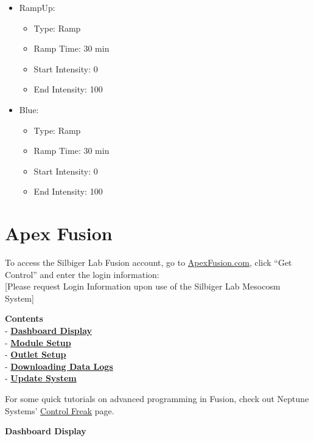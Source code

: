 \documentclass[
]{book}
\providecommand{\tightlist}{%
  \setlength{\itemsep}{0pt}\setlength{\parskip}{0pt}}
\begin{document}
\begin{itemize}
\tightlist
\item
  RampUp:

  \begin{itemize}
  \tightlist
  \item
    Type: Ramp
  \item
    Ramp Time: 30 min
  \item
    Start Intensity: 0
  \item
    End Intensity: 100
  \end{itemize}
\item
  Blue:

  \begin{itemize}
  \tightlist
  \item
    Type: Ramp
  \item
    Ramp Time: 30 min
  \item
    Start Intensity: 0
  \item
    End Intensity: 100
  \end{itemize}
\end{itemize}

\hypertarget{apex-fusion}{%
\chapter{Apex Fusion}\label{apex-fusion}}

To access the Silbiger Lab Fusion account, go to \href{https://apexfusion.com}{ApexFusion.com}, click ``Get Control'' and enter the login information:\\
{[}Please request Login Information upon use of the Silbiger Lab Mesocosm System{]}

\textbf{Contents}\\
- \protect\hyperlink{Dashboard}{\textbf{Dashboard Display}}\\
- \protect\hyperlink{Module_Setup}{\textbf{Module Setup}}\\
- \protect\hyperlink{Outlet_Setup}{\textbf{Outlet Setup}}\\
- \protect\hyperlink{Data_Logs}{\textbf{Downloading Data Logs}}\\
- \protect\hyperlink{Update}{\textbf{Update System}}

For some quick tutorials on advanced programming in Fusion, check out Neptune Systems' \href{https://www.neptunesystems.com/getstarted/apexng/apex-control-freak-advanced/}{Control Freak} page.

\textbf{Dashboard Display}
\end{document}

